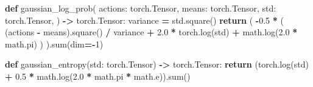 \documentclass[
  chinese,
  11pt,
  letterpaper,
]{article}
\newenvironment{Shaded}{\begin{snugshade}}{\end{snugshade}}
\newcommand{\BuiltInTok}[1]{#1}
\newcommand{\ControlFlowTok}[1]{\textcolor[rgb]{0.13,0.29,0.53}{\textbf{#1}}}
\newcommand{\DecValTok}[1]{\textcolor[rgb]{0.00,0.00,0.81}{#1}}
\newcommand{\FloatTok}[1]{\textcolor[rgb]{0.00,0.00,0.81}{#1}}
\newcommand{\KeywordTok}[1]{\textcolor[rgb]{0.13,0.29,0.53}{\textbf{#1}}}
\newcommand{\NormalTok}[1]{#1}
\newcommand{\OperatorTok}[1]{\textcolor[rgb]{0.81,0.36,0.00}{\textbf{#1}}}
\renewenvironment{Shaded}{\par\smallskip}{\par\smallskip}
\begin{document}
\begin{Shaded}
\begin{Highlighting}[]
\KeywordTok{def}\NormalTok{ gaussian\_log\_prob(}
\NormalTok{    actions: torch.Tensor,}
\NormalTok{    means: torch.Tensor,}
\NormalTok{    std: torch.Tensor,}
\NormalTok{) }\OperatorTok{{-}\textgreater{}}\NormalTok{ torch.Tensor:}
\NormalTok{    variance }\OperatorTok{=}\NormalTok{ std.square()}
    \ControlFlowTok{return}\NormalTok{ (}
        \OperatorTok{{-}}\FloatTok{0.5}
        \OperatorTok{*}\NormalTok{ (}
\NormalTok{            (actions }\OperatorTok{{-}}\NormalTok{ means).square() }\OperatorTok{/}\NormalTok{ variance}
            \OperatorTok{+} \FloatTok{2.0} \OperatorTok{*}\NormalTok{ torch.log(std)}
            \OperatorTok{+}\NormalTok{ math.log(}\FloatTok{2.0} \OperatorTok{*}\NormalTok{ math.pi)}
\NormalTok{        )}
\NormalTok{    ).}\BuiltInTok{sum}\NormalTok{(dim}\OperatorTok{={-}}\DecValTok{1}\NormalTok{)}


\KeywordTok{def}\NormalTok{ gaussian\_entropy(std: torch.Tensor) }\OperatorTok{{-}\textgreater{}}\NormalTok{ torch.Tensor:}
    \ControlFlowTok{return}\NormalTok{ (torch.log(std) }\OperatorTok{+} \FloatTok{0.5} \OperatorTok{*}\NormalTok{ math.log(}\FloatTok{2.0} \OperatorTok{*}\NormalTok{ math.pi }\OperatorTok{*}\NormalTok{ math.e)).}\BuiltInTok{sum}\NormalTok{()}



\end{Highlighting}
\end{Shaded}
\end{document}
